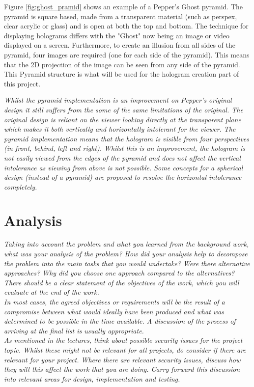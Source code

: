 Figure \ref{fig:ghost_pramid} shows an example of a Pepper's Ghost pyramid. The pyramid is square based, made from a transparent material (such as perspex, clear acrylic or glass) and is open at both the top and bottom. The technique for displaying holograms differs with the "Ghost" now being an image or video displayed on a screen. Furthermore, to create an illusion from all sides of the pyramid, four images are required (one for each side of the pyramid). This  means that the 2D projection of the image can be seen from any side of the pyramid. This Pyramid structure is what will be used for the hologram creation part of this project.

\textit{Whilst the pyramid implementation is an improvement on Pepper's original design it still suffers from the some of the same limitations of the original. The original design is reliant on the viewer looking directly at the transparent plane which makes it both vertically and horizontally intolerant for the viewer. The pyramid implementation means that the hologram is visible from four perspectives (in front, behind, left and right). Whilst this is an improvement, the hologram is not easily viewed from the edges of the pyramid and does not affect the vertical intolerance as viewing from above is not possible. Some concepts for a spherical design (instead of a pyramid) are proposed to resolve the horizontal intolerance completely.}

\section{Analysis}
\textit{Taking into account the problem and what you learned from the background work, what was your analysis of the problem? How did your analysis help to decompose the problem into the main tasks that you would undertake? Were there alternative approaches? Why did you choose one approach compared to the alternatives? \\
There should be a clear statement of the objectives of the work, which you will evaluate at the end of the work. \\
In most cases, the agreed objectives or requirements will be the result of a compromise between what would ideally have been produced and what was determined to be possible in the time available. A discussion of the process of arriving at the final list is usually appropriate.\\
As mentioned in the lectures, think about possible security issues for the project topic. Whilst these might not be relevant for all projects, do consider if there are relevant for your project. Where there are relevant security issues, discuss how they will this affect the work that you are doing. Carry forward this discussion into relevant areas for design, implementation and testing.}


